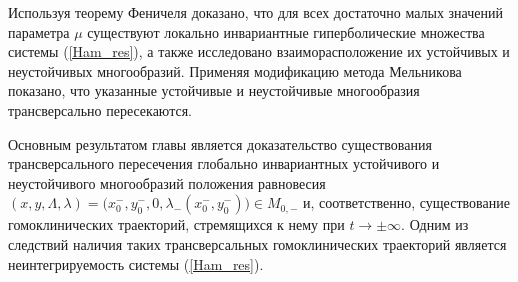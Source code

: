 Используя теорему Феничеля доказано, что для всех достаточно малых значений параметра $\mu$ существуют локально инвариантные гиперболические множества системы (\ref{Ham_res}), а также исследовано взаиморасположение их устойчивых и неустойчивых многообразий. Применяя модификацию метода Мельникова показано, что указанные устойчивые и неустойчивые многообразия трансверсально пересекаются.

Основным результатом главы является доказательство существования трансверсального пересечения глобально инвариантных устойчивого и неустойчивого многообразий положения равновесия 
$(x,y,\Lambda,\lambda) = \big( x_0^{-}, y_0^{-}, 0, \lambda_{-}(x_0^{-}, y_0^{-}) \big) \in M_{0,-}$ и, соответственно, существование гомоклинических траекторий, стремящихся к нему при $t \rightarrow \pm \infty$. Одним из следствий наличия таких трансверсальных гомоклинических траекторий является неинтегрируемость системы (\ref{Ham_res}).